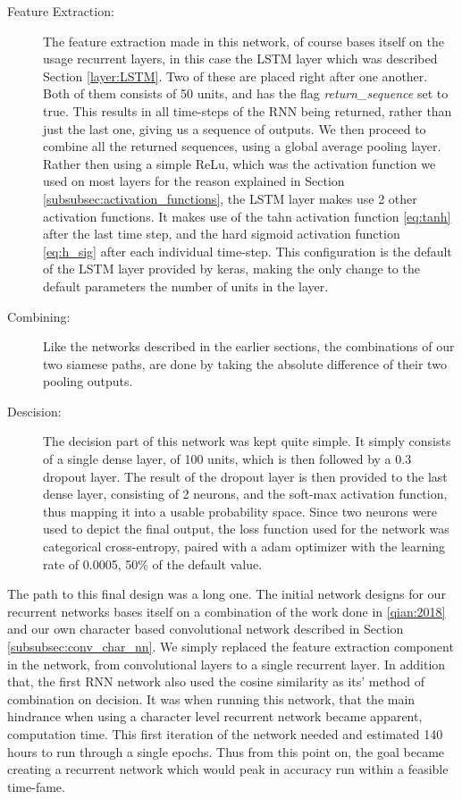 \begin{description}
\item[Feature Extraction:] The feature extraction made in this network, of
course bases itself on the usage recurrent layers, in this case the \gls{LSTM}
layer which was described Section \ref{layer:LSTM}. Two of these are placed
right after one another. Both of them consists of 50 units, and has the flag
\textit{return\_sequence} set to true. This results in all time-steps of
the \gls{RNN} being returned, rather than just the last one, giving us a
sequence of outputs. We then proceed to combine all the returned sequences,
using a global average pooling layer. Rather then using a simple ReLu, which
was the activation function we used on most layers for the reason explained
in Section \ref{subsubsec:activation_functions}, the LSTM layer makes use
2 other activation functions. It makes use of the tahn activation function
\eqref{eq:tanh} after the last time step, and the hard sigmoid activation
function \eqref{eq:h_sig} after each individual time-step. This configuration
is the default of the LSTM layer provided by keras, making the only change to
the default parameters the number of units in the layer.

\item[Combining:] Like the networks described in the earlier sections,
the combinations of our two siamese paths, are done by taking the absolute difference
of their two pooling outputs.

\item[Descision:] The decision part of this network was kept quite simple. It
simply consists of a single dense layer, of 100 units, which is then followed
by a 0.3 dropout layer. The result of the dropout layer is then provided to the
last dense layer, consisting of 2 neurons, and the soft-max activation function,
thus mapping it into a usable probability space. Since two neurons were used to
depict the final output, the loss function used for the network was categorical
cross-entropy, paired with a \gls{adam} optimizer with the learning rate
of 0.0005, 50\% of the default value.

\end{description}

The path to this final design was a long one. The initial network designs
for our recurrent networks bases itself on a combination of the work done in
\ref{qian:2018} and our own character based convolutional network described in
Section \ref{subsubsec:conv_char_nn}. We simply replaced the feature extraction
component in the network, from convolutional layers to a single recurrent layer.
In addition that, the first \gls{RNN} network also used the cosine similarity
as its' method of combination on decision. It was when running this network,
that the main hindrance when using a character level recurrent network became
apparent, computation time. This first iteration of the network needed and
estimated 140 hours to run through a single epochs. Thus from this point on, the
goal became creating a recurrent network which would peak in accuracy run within
a feasible time-fame.

